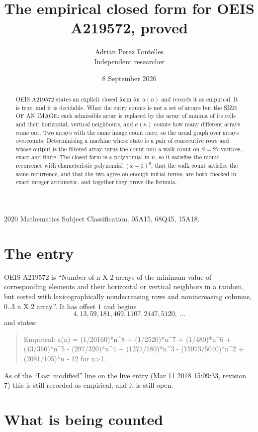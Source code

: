 \documentclass[11pt,a4paper]{article}
\title{The empirical closed form for OEIS A219572, proved}
\author{Adrian Perez Fontelles\\ \small Independent researcher}
\date{8 September 2026}
\theoremstyle{plain}
\theoremstyle{definition}
\begin{document}
\maketitle

\begin{abstract}
OEIS A219572 states an explicit closed form for $a(n)$ and records it as empirical. It is true, and
it is decidable. What the entry counts is not a set of arrays but the SIZE OF AN IMAGE: each
admissible array is replaced by the array of minima of its cells and their horizontal, vertical neighbours,
and $a(n)$ counts how many different arrays come out. Two arrays with the same image count
once, so the usual graph over arrays overcounts. Determinising a machine whose state is a pair
of consecutive rows and whose output is the filtered array turns the count into a walk count on
$S=27$ vertices, exact and finite. The closed form is a polynomial in $n$, so it satisfies the
monic recurrence with characteristic polynomial $(x-1)^{9}$; that the walk count
satisfies the same recurrence, and that the two agree on enough initial terms, are both checked
in exact integer arithmetic, and together they prove the formula.
\end{abstract}

\noindent\small 2020 Mathematics Subject Classification. 05A15, 68Q45, 15A18.\normalsize

\section{The entry}

OEIS A219572 is ``Number of n X 2 arrays of the minimum value of corresponding elements and their horizontal or vertical neighbors in a random, but sorted with lexicographically nondecreasing rows and nonincreasing columns, 0..3 n X 2 array.''. It has offset $1$ and begins
\[
4, 13, 59, 181, 469, 1107, 2447, 5120,\ \dots
\]
and states:
\begin{quote}
Empirical: a(n) = (1/20160)*n\^{}8 + (1/2520)*n\^{}7 + (1/480)*n\^{}6 + (43/360)*n\^{}5 - (297/320)*n\^{}4 + (1271/180)*n\^{}3 - (75973/5040)*n\^{}2 + (2081/105)*n - 12 for n>1.
\end{quote}
As of the ``Last modified'' line on the live entry (Mar 11 2018 15:09:33, revision 7)
this is still recorded as empirical, and it is still open.

\section{What is being counted}
\end{document}
